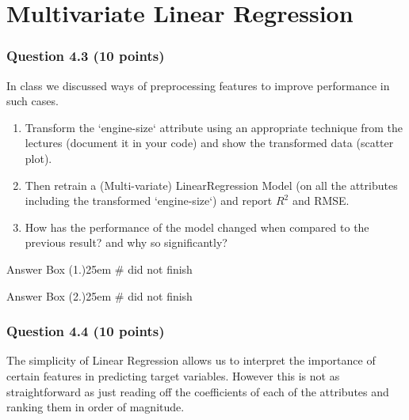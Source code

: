 \documentclass[12pt]{article}
\begin{document}

% 


\section*{Multivariate Linear Regression}
\subsubsection*{Question 4.3 (10 points)}
In class we discussed ways of preprocessing features to improve performance in such cases.
\begin{enumerate}
    \item [1.] [Code] Transform the `engine-size` attribute using an appropriate technique from the lectures (document it in your code) and show the transformed data (scatter plot).
    \item [2.] [Code] Then retrain a (Multi-variate) LinearRegression Model (on all the attributes including the transformed `engine-size`) and report $R^2$ and RMSE. 
    \item [3.] [Text] How has the performance of the model changed when compared to the previous result? and why so significantly?
\end{enumerate}

\begin{code}{Answer Box (1.)}{25em}
    # did not finish
\end{code}


\begin{code}{Answer Box (2.)}{25em}
    # did not finish
\end{code}






\subsubsection*{Question 4.4 (10 points)}
The simplicity of Linear Regression allows us to interpret the importance of certain features in predicting target variables. However this is not as straightforward as just reading off the coefficients of each of the attributes and ranking them in order of magnitude.
\end{document}
